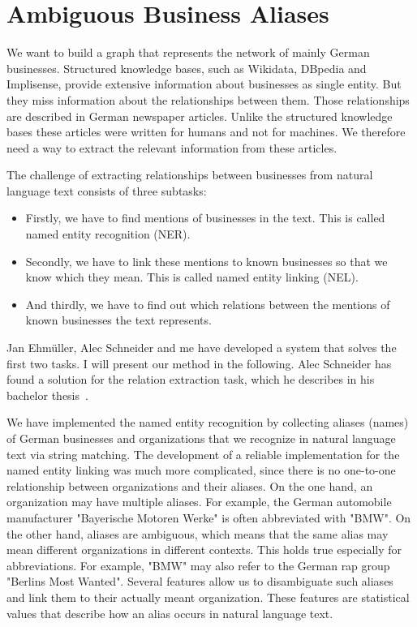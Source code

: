 \section{Ambiguous Business Aliases}
We want to build a graph that represents the network of mainly German businesses. Structured knowledge bases, such as Wikidata, DBpedia and Implisense, provide extensive information about businesses as single entity. But they miss information about the relationships between them. Those relationships are described in German newspaper articles. Unlike the structured knowledge bases these articles were written for humans and not for machines. We therefore need a way to extract the relevant information from these articles.

The challenge of extracting relationships between businesses from natural language text consists of three subtasks:
\begin{itemize}
\item Firstly, we have to find mentions of businesses in the text. This is called named entity recognition (NER).
\item Secondly, we have to link these mentions to known businesses so that we know which they mean. This is called named entity linking (NEL).
\item And thirdly, we have to find out which relations between the mentions of known businesses the text represents.
\end{itemize}
Jan Ehmüller, Alec Schneider and me have developed a system that solves the first two tasks. I will present our method in the following. Alec Schneider has found a solution for the relation extraction task, which he describes in his bachelor thesis~\cite{Alec}.

We have implemented the named entity recognition by collecting aliases (names) of German businesses and organizations that we recognize in natural language text via string matching. The development of a reliable implementation for the named entity linking was much more complicated, since there is no one-to-one relationship between organizations and their aliases. On the one hand, an organization may have multiple aliases. For example, the German automobile manufacturer "Bayerische Motoren Werke" is often abbreviated with "BMW". On the other hand, aliases are ambiguous, which means that the same alias may mean different organizations in different contexts. This holds true especially for abbreviations. For example, "BMW" may also refer to the German rap group "Berlins Most Wanted".
Several features allow us to disambiguate such aliases and link them to their actually meant organization. These features are statistical values that describe how an alias occurs in natural language text.

